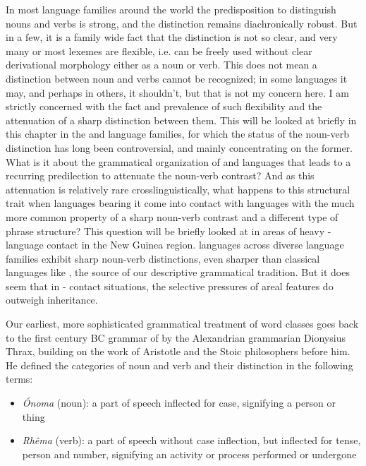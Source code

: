 \documentclass[output=paper]{langsci/langscibook}
\begin{document}
  In most language families around the world the predisposition to distinguish nouns and verbs is strong, and the distinction remains diachronically robust. But in a few, it is a family wide fact that the distinction is not so clear, and very many or most lexemes are flexible, i.e. can be freely used without clear derivational morphology either as a noun or verb. This does not mean a distinction between noun and verbs cannot be recognized;  in some languages it may, and perhaps in others, it shouldn’t, but that is not my concern here. I am strictly concerned with the fact and prevalence of such flexibility and the attenuation of a sharp distinction between them. This will be looked at briefly in this chapter in the  and  language families, for which the status of the noun-verb distinction has long been controversial, and mainly concentrating on the former. What is it about the grammatical organization of  and  languages that leads to a recurring predilection to attenuate the noun-verb contrast? And as this attenuation is relatively rare crosslinguistically, what happens to this structural trait when languages bearing it come into contact with languages with the much more common property of a sharp noun-verb contrast and a different type of phrase structure? This question will be briefly looked at in areas of heavy - language contact  in the New Guinea region.   languages across diverse language families exhibit sharp noun-verb distinctions, even sharper than classical languages like , the source of our descriptive grammatical tradition. But it does seem that in - contact situations, the selective pressures of areal features do outweigh inheritance. 

Our earliest, more sophisticated grammatical treatment of word classes goes back to the first century BC grammar of  by the Alexandrian grammarian Dionysius Thrax, building on the work of Aristotle and the Stoic philosophers before him. He defined the categories of noun and verb and their distinction in the following terms:

\begin{itemize}
 \item {\textit{Ónoma} (noun): a part of speech inflected for case, signifying a person or thing} 
 \item {\textit{Rhêma} (verb): a part of speech without case inflection, but inflected for tense, person and number, signifying an activity or process performed or undergone} 
\end{itemize}
\end{document}
